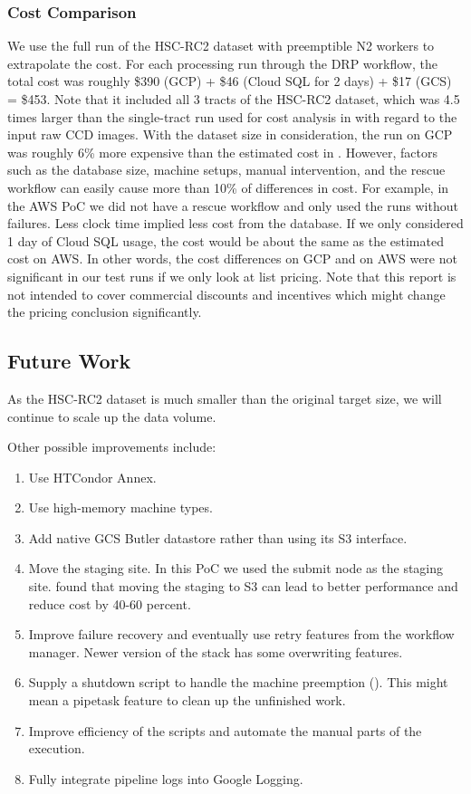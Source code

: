 \subsubsection{Cost Comparison}
We use the full run of the HSC-RC2 dataset with preemptible N2 workers to extrapolate the cost.
For each processing run through the DRP workflow, the total cost was roughly \$390 (GCP) + \$46 (Cloud SQL for 2 days) + \$17 (GCS) = \$453.
Note that it included all 3 tracts of the HSC-RC2 dataset, which was 4.5 times larger than the single-tract run used for cost analysis in  with regard to the input raw CCD images.
With the dataset size in consideration, the run on GCP was roughly 6\% more expensive than the estimated cost in .
However, factors such as the database size, machine setups, manual intervention, and the rescue workflow can easily cause more than 10\% of differences in cost.
For example, in the AWS PoC we did not have a rescue workflow and only used the runs without failures.
Less clock time implied less cost from the database.
If we only considered 1 day of Cloud SQL usage, the cost would be about the same as the estimated cost on AWS.
In other words, the cost differences on GCP and on AWS were not significant in our test runs if we only look at list pricing.
Note that this report is not intended to cover commercial discounts and incentives which might change the pricing conclusion significantly.

\subsection{Future Work} \label{sec:future}

As the HSC-RC2 dataset is much smaller than the original target size, we will continue to scale up the data volume.

Other possible improvements include:
\begin{enumerate}
\item Use HTCondor Annex.
\item Use high-memory machine types.
\item Add native GCS Butler datastore rather than using its S3 interface.
\item Move the staging site. In this PoC we used the submit node as the staging site. \citet{Bektesevic2020} found that moving the staging to S3 can lead to better performance and reduce cost by 40-60 percent.
\item Improve failure recovery and eventually use retry features from the workflow manager. Newer version of the stack has some overwriting features.
\item Supply a shutdown script to handle the machine preemption (). This might mean a pipetask feature to clean up the unfinished work.
\item Improve efficiency of the scripts and automate the manual parts of the execution.
\item Fully integrate pipeline logs into Google Logging.



\end{enumerate}

